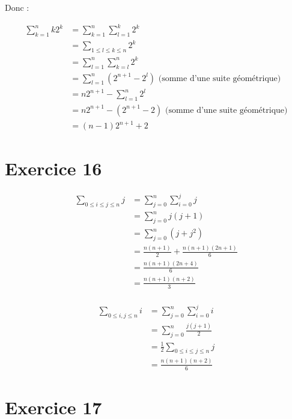 \documentclass{report}
\begin{document}
Donc :

\begin{equation*}
	\begin{split}
		\sum_{k=1}^{n} k2^k
			&= \sum_{k=1}^{n}\sum_{l=1}^{k} 2^k\\
			&= \sum_{1 \le l \le k \le n} 2^k\\
			&= \sum_{l=1}^{n}\sum_{k=l}^{n} 2^k\\
			&= \sum_{l=1}^{n} \left(2^{n+1} - 2^l\right) \text{ (somme d'une suite géométrique)}\\
			&= n 2^{n+1} - \sum_{l=1}^{n} 2^l \\
			&= n 2^{n+1} - (2^{n+1}-2)  \text{ (somme d'une suite géométrique)}\\
			&= (n-1)2^{n+1} +2
	\end{split}
\end{equation*}

\section*{Exercice 16}

\begin{equation*}
	\begin{split}
		\sum_{0\le i \le j \le n} j
		&= \sum_{j=0}^{n} \sum_{i=0}^{j} j \\
		&= \sum_{j=0}^{n} j(j+1) \\
		&= \sum_{j=0}^{n} (j + j^2) \\
		&= \frac{n(n+1)}{2} + \frac{n(n+1)(2n+1)}{6} \\
		&= \frac{n(n+1)(2n+4)}{6} \\
		&= \frac{n(n+1)(n+2)}{3} \\
	\end{split}
\end{equation*}

\begin{equation*}
	\begin{split}
		\sum_{0\le i, j \le n} i
		&= \sum_{j=0}^{n} \sum_{i=0}^{j} i \\
		&= \sum_{j=0}^{n} \frac{j(j+1)}{2} \\
		&= \frac{1}{2} \sum_{0\le i \le j \le n} j \\
		&= \frac{n(n+1)(n+2)}{6} 
	\end{split}
\end{equation*}

\section*{Exercice 17}
\end{document}
